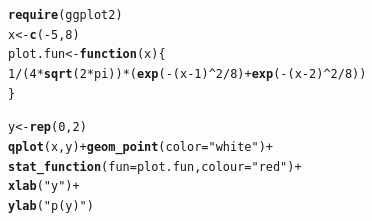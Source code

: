 \documentclass[12pt]{article}\usepackage[]{graphicx}\usepackage[]{color}
\makeatletter
\newcommand{\hlnum}[1]{\textcolor[rgb]{0.686,0.059,0.569}{#1}}%
\newcommand{\hlstr}[1]{\textcolor[rgb]{0.192,0.494,0.8}{#1}}%
\newcommand{\hlopt}[1]{\textcolor[rgb]{0,0,0}{#1}}%
\newcommand{\hlstd}[1]{\textcolor[rgb]{0.345,0.345,0.345}{#1}}%
\newcommand{\hlkwa}[1]{\textcolor[rgb]{0.161,0.373,0.58}{\textbf{#1}}}%
\newcommand{\hlkwb}[1]{\textcolor[rgb]{0.69,0.353,0.396}{#1}}%
\newcommand{\hlkwc}[1]{\textcolor[rgb]{0.333,0.667,0.333}{#1}}%
\newcommand{\hlkwd}[1]{\textcolor[rgb]{0.737,0.353,0.396}{\textbf{#1}}}%
\newenvironment{kframe}{%
 \def\at@end@of@kframe{}%
 \ifinner\ifhmode%
  \def\at@end@of@kframe{\end{minipage}}%
  \begin{minipage}{\columnwidth}%
 \fi\fi%
 \def\FrameCommand##1{\hskip\@totalleftmargin \hskip-\fboxsep
 \colorbox{shadecolor}{##1}\hskip-\fboxsep
     \hskip-\linewidth \hskip-\@totalleftmargin \hskip\columnwidth}%
 \MakeFramed {\advance\hsize-\width
   \@totalleftmargin\z@ \linewidth\hsize
   \@setminipage}}%
 {\par\unskip\endMakeFramed%
 \at@end@of@kframe}
\newenvironment{knitrout}{}{} %
\makeatother
\begin{document}
\begin{knitrout}\footnotesize
{}\color{fgcolor}\begin{kframe}
\begin{alltt}
\hlkwd{require}\hlstd{(ggplot2)}
\hlstd{x} \hlkwb{<-} \hlkwd{c}\hlstd{(}\hlopt{-}\hlnum{5}\hlstd{,} \hlnum{8}\hlstd{)}
\hlstd{plot.fun} \hlkwb{<-} \hlkwa{function}\hlstd{(}\hlkwc{x}\hlstd{)\{}
  \hlnum{1}\hlopt{/}\hlstd{(}\hlnum{4}\hlopt{*}\hlkwd{sqrt}\hlstd{(}\hlnum{2}\hlopt{*}\hlstd{pi))}\hlopt{*}\hlstd{(}\hlkwd{exp}\hlstd{(}\hlopt{-}\hlstd{(x}\hlopt{-}\hlnum{1}\hlstd{)}\hlopt{^}\hlnum{2}\hlopt{/}\hlnum{8}\hlstd{)}\hlopt{+}\hlkwd{exp}\hlstd{(}\hlopt{-}\hlstd{(x}\hlopt{-}\hlnum{2}\hlstd{)}\hlopt{^}\hlnum{2}\hlopt{/}\hlnum{8}\hlstd{))}
\hlstd{\}}

\hlstd{y} \hlkwb{<-} \hlkwd{rep}\hlstd{(}\hlnum{0}\hlstd{,}\hlnum{2}\hlstd{)}
\hlkwd{qplot}\hlstd{(x,y)}\hlopt{+}\hlkwd{geom_point}\hlstd{(}\hlkwc{color}\hlstd{=}\hlstr{"white"}\hlstd{)}\hlopt{+}
  \hlkwd{stat_function}\hlstd{(}\hlkwc{fun} \hlstd{= plot.fun,} \hlkwc{colour} \hlstd{=} \hlstr{"red"}\hlstd{)}\hlopt{+}
  \hlkwd{xlab}\hlstd{(}\hlstr{"y"}\hlstd{)}\hlopt{+}
  \hlkwd{ylab}\hlstd{(}\hlstr{"p(y)"}\hlstd{)}
\end{alltt}
\end{kframe}
\end{knitrout}
\end{document}
